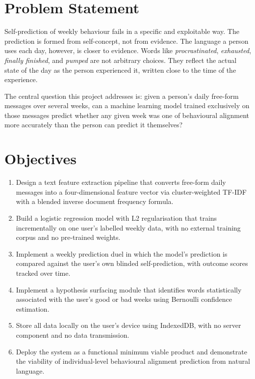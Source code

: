 \documentclass[11pt, a4paper]{report}
\begin{document}
\section{Problem Statement}

Self-prediction of weekly behaviour fails in a specific and exploitable way.
The prediction is formed from self-concept, not from evidence. The language a
person uses each day, however, is closer to evidence. Words like
\textit{procrastinated}, \textit{exhausted}, \textit{finally finished}, and
\textit{pumped} are not arbitrary choices. They reflect the actual state of
the day as the person experienced it, written close to the time of the
experience.

The central question this project addresses is: given a person's daily
free-form messages over several weeks, can a machine learning model trained
exclusively on those messages predict whether any given week was one of
behavioural alignment more accurately than the person can predict it
themselves?

\section{Objectives}

\begin{enumerate}
  \item Design a text feature extraction pipeline that converts free-form daily
    messages into a four-dimensional feature vector via cluster-weighted
    TF-IDF with a blended inverse document frequency formula.

  \item Build a logistic regression model with L2 regularisation that trains
    incrementally on one user's labelled weekly data, with no external
    training corpus and no pre-trained weights.

  \item Implement a weekly prediction duel in which the model's prediction is
    compared against the user's own blinded self-prediction, with outcome
    scores tracked over time.

  \item Implement a hypothesis surfacing module that identifies words
    statistically associated with the user's good or bad weeks using
    Bernoulli confidence estimation.

  \item Store all data locally on the user's device using IndexedDB, with no
    server component and no data transmission.

  \item Deploy the system as a functional minimum viable product and
    demonstrate the viability of individual-level behavioural alignment
    prediction from natural language.
\end{enumerate}
\end{document}

